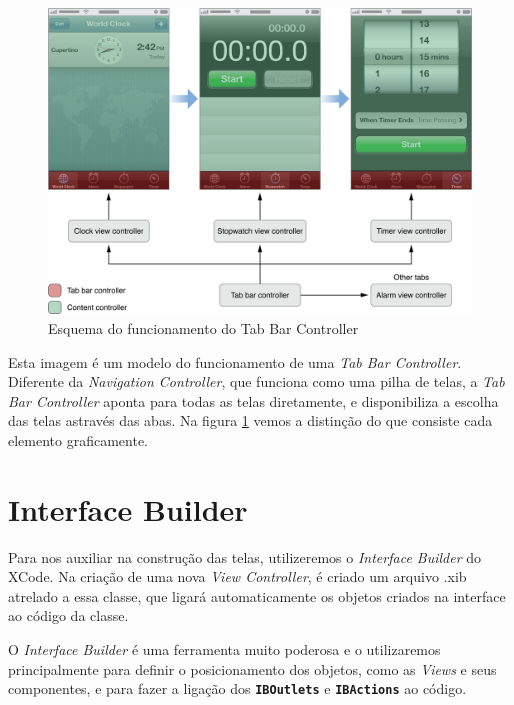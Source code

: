 \documentclass[a4paper,12pt,brazil,doubleside]{book}
\begin{document}
\begin{singlespace}
\begin{figure}[h]
  \centering
  \includegraphics[width=\textwidth]{figuras/apple_tabbar_interface.png}
  \caption{Esquema do funcionamento do Tab Bar Controller}
  \label{fig:tab_bar_controller}
\end{figure}


Esta imagem é um modelo do funcionamento de uma \emph{Tab Bar Controller}. Diferente da \emph{Navigation Controller}, que funciona como uma pilha de telas, a \emph{Tab Bar Controller} aponta para todas as telas diretamente, e disponibiliza a escolha das telas astravés das abas. Na figura \ref{fig:tab_bar_controller} vemos a distinção do que consiste cada elemento graficamente.

\section{Interface Builder}

Para nos auxiliar na construção das telas, utilizeremos o \emph{Interface Builder} do XCode. Na criação de uma nova \emph{View Controller}, é criado um arquivo .xib atrelado a essa classe, que ligará automaticamente os objetos criados na interface ao código da classe.

O \emph{Interface Builder} é uma ferramenta muito poderosa e o utilizaremos principalmente para definir o posicionamento dos objetos, como as \emph{Views} e seus componentes, e para fazer a ligação dos \texttt{\textbf{IBOutlets}} e \texttt{\textbf{IBActions}} ao código.

\begin{framed}


\end{framed}
\end{singlespace}
\end{document}

